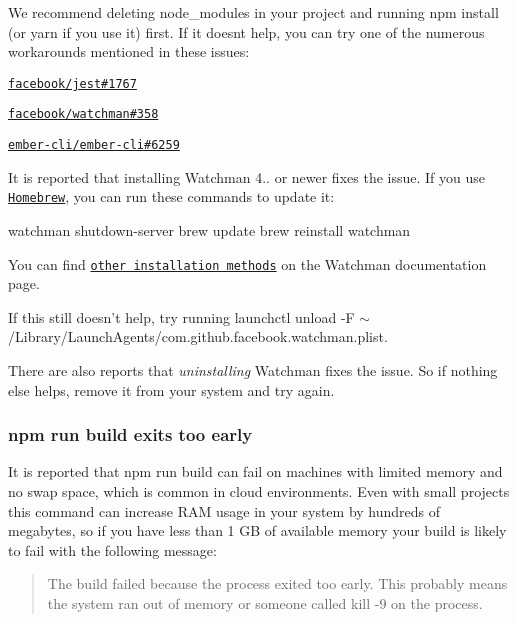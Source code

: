 We recommend deleting {\ttfamily node\+\_\+modules} in your project and running {\ttfamily npm install} (or {\ttfamily yarn} if you use it) first. If it doesn\textquotesingle{}t help, you can try one of the numerous workarounds mentioned in these issues\+:


\begin{DoxyItemize}
\item \href{https://github.com/facebook/jest/issues/1767}{\tt facebook/jest\#1767}
\item \href{https://github.com/facebook/watchman/issues/358}{\tt facebook/watchman\#358}
\item \href{https://github.com/ember-cli/ember-cli/issues/6259}{\tt ember-\/cli/ember-\/cli\#6259}
\end{DoxyItemize}

It is reported that installing Watchman 4.. or newer fixes the issue. If you use \href{http://brew.sh/}{\tt Homebrew}, you can run these commands to update it\+:


\begin{DoxyCode}
watchman shutdown-server
brew update
brew reinstall watchman
\end{DoxyCode}


You can find \href{https://facebook.github.io/watchman/docs/install.html#build-install}{\tt other installation methods} on the Watchman documentation page.

If this still doesn’t help, try running {\ttfamily launchctl unload -\/F $\sim$/\+Library/\+Launch\+Agents/com.github.\+facebook.\+watchman.\+plist}.

There are also reports that {\itshape uninstalling} Watchman fixes the issue. So if nothing else helps, remove it from your system and try again.

\subsubsection*{{\ttfamily npm run build} exits too early}

It is reported that {\ttfamily npm run build} can fail on machines with limited memory and no swap space, which is common in cloud environments. Even with small projects this command can increase R\+AM usage in your system by hundreds of megabytes, so if you have less than 1 GB of available memory your build is likely to fail with the following message\+:

\begin{quote}
The build failed because the process exited too early. This probably means the system ran out of memory or someone called {\ttfamily kill -\/9} on the process. \end{quote}


